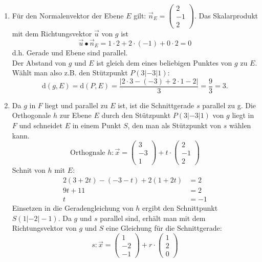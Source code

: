 \begin{enumerate}
  \item Für den Normalenvektor der Ebene $E$ gilt: $\vec n_E=\left(\begin{array}{c} 2\\ -1\\ 2\end{array}\right)$. Das Skalarprodukt mit dem Richtungsvektor $\vec u$ von $g$ ist
  \begin{equation*}
    \vec u\bullet\vec n_E = 1\cdot 2 + 2\cdot(-1) + 0\cdot 2 = 0
  \end{equation*}
  d.h. Gerade und Ebene sind parallel.
  \\Der Abstand von $g$ und $E$ ist gleich dem eines beliebigen Punktes von $g$ zu $E$. Wählt man also z.B. den Stützpunkt $P(3|-3|1)$:
  \begin{equation*}
    \mathrm d(g,E)=\mathrm d(P,E)=\frac{|2\cdot3-(-3)+2\cdot1-2|}{3}=\frac{9}{3} = 3.
  \end{equation*}
  \item Da $g$ in $F$ liegt und parallel zu $E$ ist, ist die Schnittgerade $s$ parallel zu g.
  Die Orthogonale $h$ zur Ebene $E$ durch den Stützpunkt $P(3|-3|1)$ von $g$ liegt in $F$ und schneidet $E$ in einem Punkt $S$, den man als Stützpunkt von $s$ wählen kann.
  \begin{equation*}
    \text{Orthognale } h:\vec x = \left(\begin{array}{c}3\\-3\\1\end{array}\right)+t\cdot\left(\begin{array}{c}2\\-1\\2\end{array}\right)
  \end{equation*}
  Schnit von $h$ mit $E$:
  \begin{align*}
    2(3+2t)-(-3-t)+2(1+2t)&=2\\
    9t+11&=2\\
    t&=-1
  \end{align*}
  Einsetzen in die Geradengleichung von $h$ ergibt den Schnittpunkt $S(1|-2|-1)$. Da $g$ und $s$ parallel sind, erhält man mit dem Richtungsvektor von $g$ und $S$ eine Gleichung für die Schnittgerade:
  \begin{equation*}
    s:\vec x=\left(\begin{array}{c}1\\-2\\-1\end{array}\right)+r\cdot\left(\begin{array}{c}1\\2\\0\end{array}\right)
  \end{equation*}
\end{enumerate}

